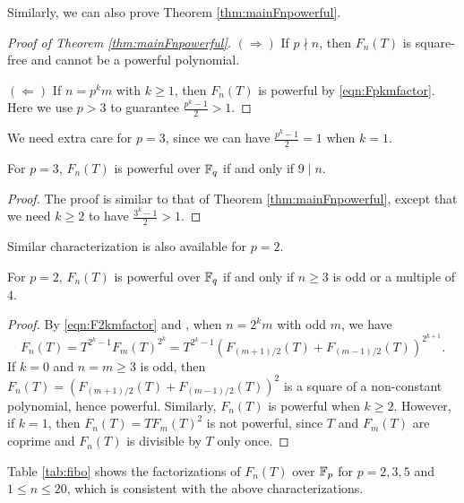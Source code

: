 Similarly, we can also prove Theorem \ref{thm:mainFnpowerful}.
\begin{proof}[Proof of Theorem \ref{thm:mainFnpowerful}]
    $(\Rightarrow)$ If $p \nmid n$, then $F_n(T)$ is square-free and cannot be a powerful polynomial.

    $(\Leftarrow)$ If $n = p^k m$ with $k \ge 1$, then $F_n(T)$ is powerful by \eqref{eqn:Fpkmfactor}.
    Here we use $p > 3$ to guarantee $\frac{p^k - 1}{2} > 1$.
\end{proof}

We need extra care for $p = 3$, since we can have $\frac{p^k - 1}{2} = 1$ when $k = 1$.
\begin{corollary}
    \label{cor:powerfulp3}
    For $p = 3$, $F_n(T)$ is powerful over $\mathbb{F}_q$ if and only if $9 \mid n$.
\end{corollary}
\begin{proof}
    The proof is similar to that of Theorem \ref{thm:mainFnpowerful}, except that we need $k \ge 2$ to have $\frac{3^k - 1}{2} > 1$.
\end{proof}

Similar characterization is also available for $p = 2$.
\begin{corollary}
\label{cor:powerfulp2}
    For $p = 2$, $F_n(T)$ is powerful over $\mathbb{F}_q$ if and only if $n \ge 3$ is odd or a multiple of $4$.
\end{corollary}
\begin{proof}
    By \eqref{eqn:F2kmfactor} and \cite[Lemma 3.5]{kitayama2017irreducibility}, when $n = 2^k m$ with odd $m$, we have 
    \[F_n(T) = T^{2^k - 1}F_{m}(T)^{2^k} = T^{2^k - 1}(F_{(m+1)/2}(T)  + F_{(m-1)/2}(T))^{2^{k+1}}.\]
    If $k = 0$ and $n = m \ge 3$ is odd, then $F_n(T) = (F_{(m+1)/2}(T)  + F_{(m-1)/2}(T))^{2}$ is a square of a non-constant polynomial, hence powerful.
    Similarly, $F_n(T)$ is powerful when $k \ge 2$.
    However, if $k = 1$, then $F_n(T) = TF_m(T)^2$ is not powerful, since $T$ and $F_m(T)$ are coprime and $F_n(T)$ is divisible by $T$ only once.
\end{proof}

Table \ref{tab:fibo} shows the factorizations of $F_n(T)$ over $\mathbb{F}_p$ for $p = 2, 3, 5$ and $1 \le n \le 20$, which is consistent with the above characterizations.